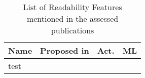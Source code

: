 \begin{table}[htbp]
    \caption{List of Readability Features mentioned in the assessed publications}
    \label{tab:feat_Readability}
    \centering
    \begin{tabular}{m{} m{} c c}
        \toprule
        \textbf{Name} & \textbf{Proposed in} & \textbf{Act.} & \textbf{ML} \\ 
        \midrule
        test
        \bottomrule
    \end{tabular}
\end{table}